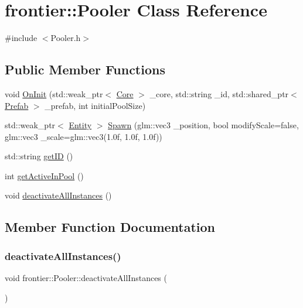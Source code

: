 \hypertarget{classfrontier_1_1_pooler}{}\section{frontier\+:\+:Pooler Class Reference}
\label{classfrontier_1_1_pooler}


{\ttfamily \#include $<$Pooler.\+h$>$}

\subsection*{Public Member Functions}
\begin{DoxyCompactItemize}
\item 
void \hyperlink{classfrontier_1_1_pooler_ad62089e85f54e4cfa198f1f796e2bfea}{On\+Init} (std\+::weak\+\_\+ptr$<$ \hyperlink{classfrontier_1_1_core}{Core} $>$ \+\_\+core, std\+::string \+\_\+id, std\+::shared\+\_\+ptr$<$ \hyperlink{classfrontier_1_1_prefab}{Prefab} $>$ \+\_\+prefab, int initial\+Pool\+Size)
\item 
std\+::weak\+\_\+ptr$<$ \hyperlink{classfrontier_1_1_entity}{Entity} $>$ \hyperlink{classfrontier_1_1_pooler_acd7ce56f3b19b8fb6e4eb2ba94328573}{Spawn} (glm\+::vec3 \+\_\+position, bool modify\+Scale=false, glm\+::vec3 \+\_\+scale=glm\+::vec3(1.\+0f, 1.\+0f, 1.\+0f))
\item 
std\+::string \hyperlink{classfrontier_1_1_pooler_a5fb9072149f17191cdf585a4200561a9}{get\+ID} ()
\item 
int \hyperlink{classfrontier_1_1_pooler_a7b4e2884404c3c939b0d6feccade6a70}{get\+Active\+In\+Pool} ()
\item 
void \hyperlink{classfrontier_1_1_pooler_a67a23cf20cbe59488f26d0a9bd481e63}{deactivate\+All\+Instances} ()
\end{DoxyCompactItemize}


\subsection{Member Function Documentation}
\mbox{\label{classfrontier_1_1_pooler_a67a23cf20cbe59488f26d0a9bd481e63}} 
\subsubsection{\texorpdfstring{deactivate\+All\+Instances()}{deactivateAllInstances()}}
{\footnotesize\ttfamily void frontier\+::\+Pooler\+::deactivate\+All\+Instances (\begin{DoxyParamCaption}{ }\end{DoxyParamCaption})}

